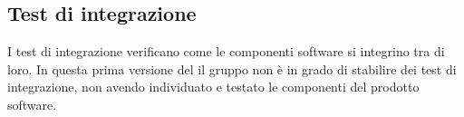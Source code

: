 \subsection{Test di integrazione}
I test di integrazione verificano come le componenti software si integrino tra di loro.
In questa prima versione del \PdQ{} il gruppo non è in grado di stabilire dei test di integrazione, non avendo individuato e testato le componenti del prodotto software.